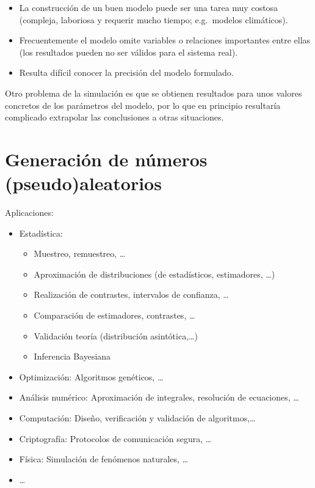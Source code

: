 \documentclass[
]{book}
\theoremstyle{break}
\theoremstyle{definition}
\theoremstyle{definition}
\theoremstyle{definition}
\theoremstyle{remark}
\begin{document}
\begin{itemize}
\item
  La construcción de un buen modelo puede ser una tarea muy costosa
  (compleja, laboriosa y requerir mucho tiempo;
  e.g.~modelos climáticos).
\item
  Frecuentemente el modelo omite variables o relaciones importantes entre ellas
  (los resultados pueden no ser válidos para el sistema real).
\item
  Resulta difícil conocer la precisión del modelo formulado.
\end{itemize}

Otro problema de la simulación es que se obtienen resultados para unos valores concretos de los parámetros del modelo, por lo que en principio
resultaría complicado extrapolar las conclusiones a otras situaciones.

\hypertarget{generaciuxf3n-de-nuxfameros-pseudoaleatorios}{%
\section{Generación de números (pseudo)aleatorios}\label{generaciuxf3n-de-nuxfameros-pseudoaleatorios}}

Aplicaciones:

\begin{itemize}
\item
  Estadística:

  \begin{itemize}
  \item
    Muestreo, remuestreo, \ldots{}
  \item
    Aproximación de distribuciones (de estadísticos, estimadores, \ldots)
  \item
    Realización de contrastes, intervalos de confianza, \ldots{}
  \item
    Comparación de estimadores, contrastes, \ldots{}
  \item
    Validación teoría (distribución asintótica,\ldots)
  \item
    Inferencia Bayesiana
  \end{itemize}
\item
  Optimización: Algoritmos genéticos, \ldots{}
\item
  Análisis numérico: Aproximación de integrales, resolución de ecuaciones, \ldots{}
\item
  Computación: Diseño, verificación y validación de algoritmos,\ldots{}
\item
  Criptografía: Protocolos de comunicación segura, \ldots{}
\item
  Física: Simulación de fenómenos naturales, \ldots{}
\item
  \ldots{}
\end{itemize}
\end{document}

